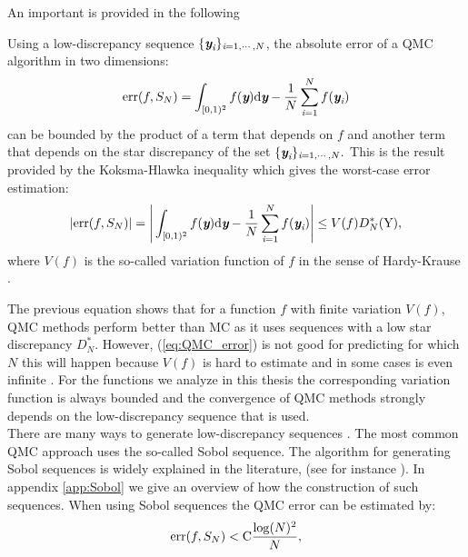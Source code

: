 An important is provided in the following
\begin{theorem} Using a low-discrepancy sequence $\{\textit{\textbf{y}}_{\textit{i}}\}_{\textit{i}=1, \cdots, N}$, the absolute error of a QMC algorithm in two dimensions:
\begin{equation}
\textrm{err}(f, S_{N}) =\int_{[0,1)^2}f(\textit{\textbf{y}}) \textrm{d}\textit{\textbf{y}}-\frac{1}{N}\sum_{\textit{i}=1}^{N}f(\textit{\textbf{y}}_{\textit{i}})
\end{equation}
 can be bounded by the product of a term that depends on $f$ and another term that depends on the star discrepancy of the set $\{\textit{\textbf{y}}_{\textit{i}}\}_{\textit{i}=1, \cdots, N}.$ This is the result provided by the Koksma-Hlawka inequality which gives the worst-case error estimation:
\begin{equation}\label{eq:QMC_error}
|\textrm{err}(f, S_{N})|= \Bigg|\int_{[0,1)^2}f(\textit{\textbf{y}}) \textrm{d}\textit{\textbf{y}}-\frac{1}{N}\sum_{\textit{i}=1}^{N}f(\textit{\textbf{y}}_{\textit{i}})\Bigg|\leq V(f)D^*_N(\mbox{$\textup{Y}$}),
\end{equation}
where $V(f)$ is the so-called variation function of $f$ in the sense of Hardy-Krause \cite{brandolini2013koksma}. 
\end{theorem}
The previous equation shows that for a function $f$ with finite variation $V(f)$, QMC methods perform better than MC as it uses sequences with a low star discrepancy $D^*_N$. However, (\ref{eq:QMC_error}) is not good for predicting for which $N$ this will happen because $V(f)$ is hard to estimate and in some cases is even infinite \cite{wang2008low}. 
For the functions we analyze in this thesis the corresponding variation function is always bounded and the convergence of QMC methods strongly depends on the low-discrepancy sequence that is used.\\ \indent
There are many ways to generate low-discrepancy sequences \cite{dalal2008low}. The most common QMC approach uses the so-called Sobol sequence. The algorithm for generating Sobol sequences is widely explained in the literature, (see for instance \cite{bratley1988algorithm}). In appendix \ref{app:Sobol} we give an overview of how the construction of such sequences. When using Sobol sequences the QMC error can be estimated by:
\begin{equation}
\textrm{err}(f, S_{N})<\textrm{C} \frac{\log(N)^2}{N}, 
\end{equation}
